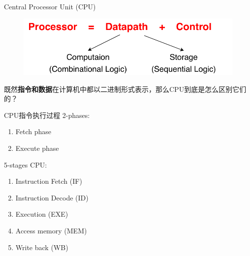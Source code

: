 \documentclass{myslide}
\begin{document}
\begin{frame}{Central Processor Unit (CPU)}
\begin{figure}
\centering
\includegraphics[width=0.8\linewidth]{fig/Lecture2/Abstraction-Processor.pdf}
\end{figure}
\end{frame}

\begin{frame}
\Large 既然\textbf{指令和数据}在计算机中都以二进制形式表示，那么CPU到底是怎么区别它们的？
\end{frame}

\begin{frame}{CPU指令执行过程}
2-phases:
\begin{enumerate}
	\item Fetch phase
	\item Execute phase
\end{enumerate}
5-stages CPU:
\begin{enumerate}
	\item Instruction Fetch (IF)
	\item Instruction Decode (ID)
	\item Execution (EXE)
	\item Access memory (MEM)
	\item Write back (WB)
\end{enumerate}
\end{frame}
\end{document}
